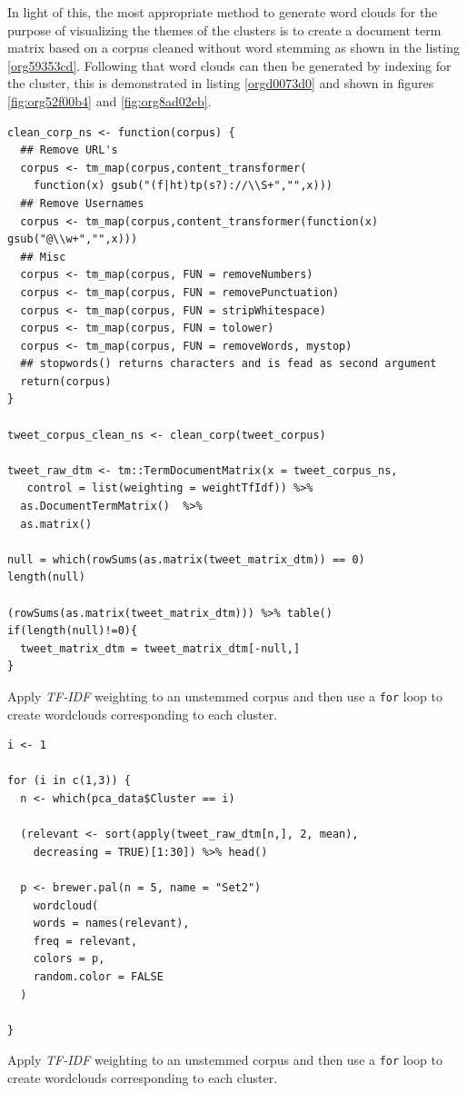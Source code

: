 \documentclass[11pt]{article}
\begin{document}
In light of this, the most appropriate method to generate word clouds for the
purpose of visualizing the themes of the clusters is to create a document term
matrix based on a corpus cleaned without word stemming as shown in the listing \ref{org59353cd}.
Following that word clouds can then be generated by indexing for the cluster,
this is demonstrated in listing \ref{orgd0073d0} and shown in figures \ref{fig:org52f00b4} and \ref{fig:org8ad02eb}.


\begin{listing}[htbp]
\begin{verbatim}
clean_corp_ns <- function(corpus) {
  ## Remove URL's
  corpus <- tm_map(corpus,content_transformer(
    function(x) gsub("(f|ht)tp(s?)://\\S+","",x)))
  ## Remove Usernames
  corpus <- tm_map(corpus,content_transformer(function(x) gsub("@\\w+","",x)))
  ## Misc
  corpus <- tm_map(corpus, FUN = removeNumbers)
  corpus <- tm_map(corpus, FUN = removePunctuation)
  corpus <- tm_map(corpus, FUN = stripWhitespace)
  corpus <- tm_map(corpus, FUN = tolower)
  corpus <- tm_map(corpus, FUN = removeWords, mystop)
  ## stopwords() returns characters and is fead as second argument
  return(corpus)
}

tweet_corpus_clean_ns <- clean_corp(tweet_corpus)

tweet_raw_dtm <- tm::TermDocumentMatrix(x = tweet_corpus_ns,
   control = list(weighting = weightTfIdf)) %>%
  as.DocumentTermMatrix()  %>%
  as.matrix()

null = which(rowSums(as.matrix(tweet_matrix_dtm)) == 0)
length(null)

(rowSums(as.matrix(tweet_matrix_dtm))) %>% table()
if(length(null)!=0){
  tweet_matrix_dtm = tweet_matrix_dtm[-null,]
}

\end{verbatim}
\caption{\label{org59353cd}Apply \emph{TF-IDF} weighting to an unstemmed corpus and then use a \texttt{for} loop to create wordclouds corresponding to each cluster.}
\end{listing}

\begin{listing}[htbp]
\begin{verbatim}
i <- 1

for (i in c(1,3)) {
  n <- which(pca_data$Cluster == i)

  (relevant <- sort(apply(tweet_raw_dtm[n,], 2, mean),
    decreasing = TRUE)[1:30]) %>% head()

  p <- brewer.pal(n = 5, name = "Set2")
    wordcloud(
    words = names(relevant),
    freq = relevant,
    colors = p,
    random.color = FALSE
  )

}
\end{verbatim}
\caption{\label{orgd0073d0}Apply \emph{TF-IDF} weighting to an unstemmed corpus and then use a \texttt{for} loop to create wordclouds corresponding to each cluster.}
\end{listing}
\end{document}
